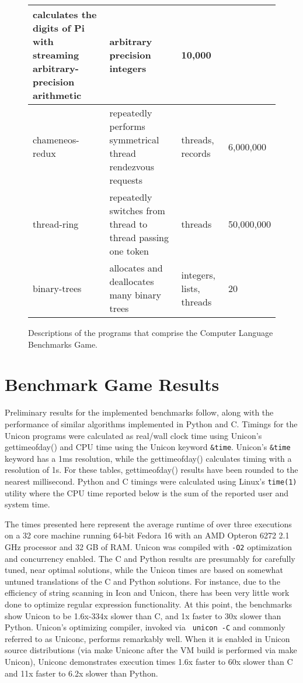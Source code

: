 \documentclass[letterpaper,12pt]{article}
\newcommand{\squeezeup}{\vspace{-1em}}
\begin{document}
\begin{figure}[h]
\begin{center}
{\begin{tabular}{ | p{1.6cm} | p{6.6cm} | p{3.2cm} | p{1.4cm} |}
        calculates the digits of Pi with streaming arbitrary-precision arithmetic & 
        arbitrary precision integers &   
        10,000
        \\ \hline
        chameneos-redux & 
        repeatedly performs symmetrical thread rendezvous requests & 
        threads, records &   
        6,000,000
        \\ \hline
        thread-ring & 
        repeatedly switches from thread to thread passing one token & 
        threads &   
        50,000,000
        \\ \hline
        binary-trees & 
        allocates and deallocates many binary trees & 
        integers, lists, threads &  
        20
        \\ \hline
      \end{tabular}
    }
    \squeezeup
  \end{center}
  \caption{Descriptions of the programs that comprise the Computer
    Language Benchmarks Game.}
  \label{fig2}
  \squeezeup
\end{figure}

\section{Benchmark Game Results}

Preliminary results for the implemented benchmarks follow, along with
the performance of similar algorithms implemented in Python and
C. Timings for the Unicon programs were calculated as real/wall clock
time using Unicon's gettimeofday() and CPU time using the Unicon
keyword {\tt \&time}. Unicon's {\tt \&time} keyword has a 1ms resolution,
while the gettimeofday() calculates timing with a resolution of
1{\textmu}s. For these tables, gettimeofday() results have been rounded to
the nearest millisecond. Python and C timings were calculated using
Linux's \texttt{time(1)} utility where the CPU time reported below is
the sum of the reported user and system time.

The times presented here represent the average runtime of over three
executions on a 32 core machine running 64-bit Fedora 16 with an AMD
Opteron 6272 2.1 GHz processor and 32 GB of RAM. Unicon was compiled
with {\tt-O2} optimization and concurrency enabled. The C and Python
results are presumably for carefully tuned, near optimal solutions,
while the Unicon times are based on somewhat untuned translations of
the C and Python solutions. For instance, due to the efficiency of
string scanning in Icon and Unicon, there has been very little work
done to optimize regular expression functionality. At this point, the
benchmarks show Unicon to be 1.6x-334x slower than C, and 1x faster to
30x slower than Python. Unicon's optimizing compiler, invoked via {\tt
  unicon -C} and commonly referred to as Uniconc, performs remarkably
well. When it is enabled in Unicon source distributions (via make
Uniconc after the VM build is performed via make Unicon), Uniconc
demonstrates execution times 1.6x faster to 60x slower than C and 11x
faster to 6.2x slower than Python.
\end{document}
